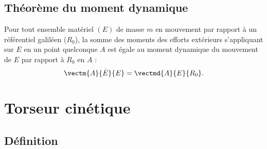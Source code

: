 
\subsection{Théorème du moment dynamique}
\begin{theorem}
			Pour tout ensemble matériel $(E)$ de masse $m$ en mouvement par rapport à un référentiel galiléen ($R_0$), la somme des moments des efforts extérieurs s'appliquant sur $E$ en un point quelconque $A$ est égale au moment dynamique du mouvement de $E$ par rapport à $R_0$ en $A$ :
			$$
				\vectm{A}{\bar E}{E}=\vectmd{A}{E}{R_0}.
			$$
		\end{theorem}

%
%
%

\section{Torseur cinétique }

\subsection{Définition}
  

